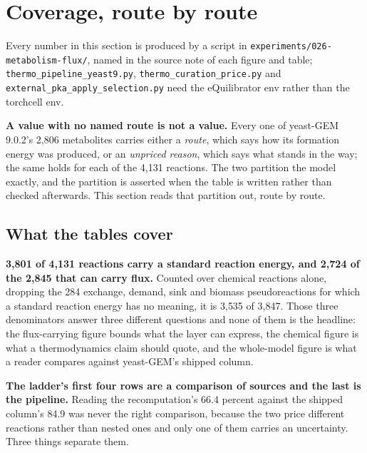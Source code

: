 
\section{Coverage, route by route}
\label{sec:coverage}

Every number in this section is produced by a script in
\texttt{experiments/026-metabolism-flux/}, named in the source note of each figure and
table; \texttt{thermo\_pipeline\_}\allowbreak\texttt{yeast9.py},
\texttt{thermo\_curation\_}\allowbreak\texttt{price.py} and
\texttt{external\_pka\_}\allowbreak\texttt{apply\_selection.py} need the eQuilibrator env
rather than the torchcell env.

\textbf{A value with no named route is not a value.} Every one of yeast-GEM 9.0.2's 2{,}806
metabolites carries either a \emph{route}, which says how its formation energy was
produced, or an \emph{unpriced reason}, which says what stands in the way; the same holds
for each of the 4{,}131 reactions. The two partition the model exactly, and the partition
is asserted when the table is written rather than checked afterwards. This section reads
that partition out, route by route.



\subsection{What the tables cover}



\textbf{3{,}801 of 4{,}131 reactions carry a standard reaction energy, and 2{,}724 of the
2{,}845 that can carry flux.} Counted over chemical reactions alone, dropping the 284
exchange, demand, sink and biomass pseudoreactions for which a standard reaction energy has
no meaning, it is 3{,}535 of 3{,}847. Those three denominators answer three different
questions and none of them is the headline: the flux-carrying figure bounds what the layer
can express, the chemical figure is what a thermodynamics claim should quote, and the
whole-model figure is what a reader compares against yeast-GEM's shipped column.

\textbf{The ladder's first four rows are a comparison of sources and the last is the
pipeline.} Reading the recomputation's 66.4 percent against the shipped column's 84.9 was
never the right comparison, because the two price different reactions rather than nested
ones and only one of them carries an uncertainty. Three things separate them.

